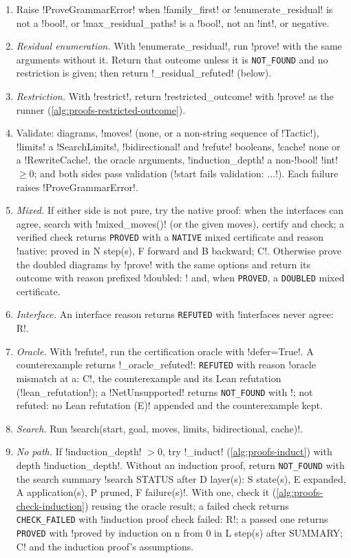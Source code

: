 \begin{algorithm}[Prover]\label{alg:proofs-prove}
\leavevmode
\begin{enumerate}
\item Raise \py!ProveGrammarError! when \py!family_first! or \py!enumerate_residual! is not a \py!bool!, or \py!max_residual_paths! is a \py!bool!, not an \py!int!, or negative.
\item \emph{Residual enumeration.} With \py!enumerate_residual!, run \py!prove! with the same arguments without it. Return that outcome unless it is \texttt{NOT\_FOUND} and no restriction is given; then return \py!_residual_refuted! (below).
\item \emph{Restriction.} With \py!restrict!, return \py!restricted_outcome! with \py!prove! as the runner (\cref{alg:proofs-restricted-outcome}).
\item Validate: diagrams, \py!moves! (none, or a non-string sequence of \py!Tactic!), \py!limits! a \py!SearchLimits!, \py!bidirectional! and \py!refute! booleans, \py!cache! none or a \py!RewriteCache!, the oracle arguments, \py!induction_depth! a non-\py!bool! \py!int! $\ge0$; and both sides pass validation (\code!start fails validation: ...!). Each failure raises \py!ProveGrammarError!.
\item \emph{Mixed.} If either side is not pure, try the native proof: when the interfaces can agree, search with \py!mixed_moves()! (or the given moves), certify and check; a verified check returns \texttt{PROVED} with a \texttt{NATIVE} mixed certificate and reason \code!native: proved in N step(s), F forward and B backward; C!. Otherwise prove the doubled diagrams by \py!prove! with the same options and return its outcome with reason prefixed \code!doubled: ! and, when \texttt{PROVED}, a \texttt{DOUBLED} mixed certificate.
\item \emph{Interface.} An interface reason returns \texttt{REFUTED} with \code!interfaces never agree: R!.
\item \emph{Oracle.} With \py!refute!, run the certification oracle with \py!defer=True!. A counterexample returns \py!_oracle_refuted!: \texttt{REFUTED} with reason \code!oracle mismatch at {a}: C!, the counterexample and its Lean refutation (\py!lean_refutation!); a \py!NetUnsupported! returns \texttt{NOT\_FOUND} with \code!; not refuted: no Lean refutation (E)! appended and the counterexample kept.
\item \emph{Search.} Run \py!search(start, goal, moves, limits, bidirectional, cache)!.
\item \emph{No path.} If \py!induction_depth! $>0$, try \py!_induct! (\cref{alg:proofs-induct}) with depth \py!induction_depth!. Without an induction proof, return \texttt{NOT\_FOUND} with the search summary \code!search STATUS after D layer(s): S state(s), E expanded, A application(s), P pruned, F failure(s)!. With one, check it (\cref{alg:proofs-check-induction}) reusing the oracle result; a failed check returns \texttt{CHECK\_FAILED} with \code!induction proof check failed: R!; a passed one returns \texttt{PROVED} with \code!proved by induction on n from 0 in L step(s) after SUMMARY; C! and the induction proof's assumptions.

\end{enumerate}
\end{algorithm}
